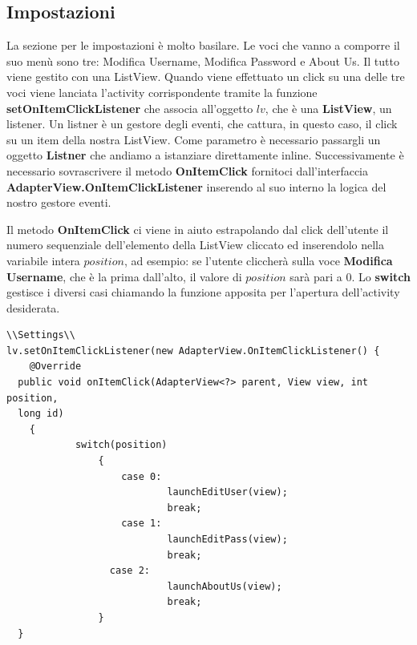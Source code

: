 \documentclass[a4paper, 50pt, twoside]{article}
\begin{document}
\subsection{Impostazioni}
La sezione per le impostazioni è molto basilare. Le voci che vanno a comporre il suo menù sono tre: Modifica Username, Modifica Password e About Us. Il tutto viene gestito con una ListView. Quando viene effettuato un click su una delle tre voci viene lanciata l’activity corrispondente tramite la funzione \textbf{setOnItemClickListener} che associa all'oggetto $lv$, che è una \textbf{ListView}, un listener. Un listner è un gestore degli eventi, che cattura, in questo caso, il click su un item della nostra ListView. Come parametro è necessario passargli un oggetto \textbf{Listner} che andiamo a istanziare direttamente inline. Successivamente è necessario sovrascrivere il metodo \textbf{OnItemClick} fornitoci dall'interfaccia \textbf{AdapterView.OnItemClickListener} inserendo al suo interno la logica del nostro gestore eventi.

Il metodo \textbf{OnItemClick} ci viene in aiuto estrapolando dal click dell'utente il numero sequenziale dell'elemento della ListView cliccato ed inserendolo nella variabile intera $position$, ad esempio: se l'utente cliccherà sulla voce \textbf{Modifica Username}, che è la prima dall'alto, il valore di $position$ sarà pari a $0$. Lo \textbf{switch} gestisce i diversi casi chiamando la funzione apposita per l'apertura dell'activity desiderata.
\begin{lstlisting}
\\Settings\\
lv.setOnItemClickListener(new AdapterView.OnItemClickListener() {
	@Override
  public void onItemClick(AdapterView<?> parent, View view, int position,
  long id)
	{
        	switch(position)
                {
                	case 0:
                        	launchEditUser(view);
                       		break;
                	case 1:
                        	launchEditPass(view);
                        	break;
                  case 2:
                        	launchAboutUs(view);
                        	break;
                }
  }
\end{lstlisting}
\end{document}
